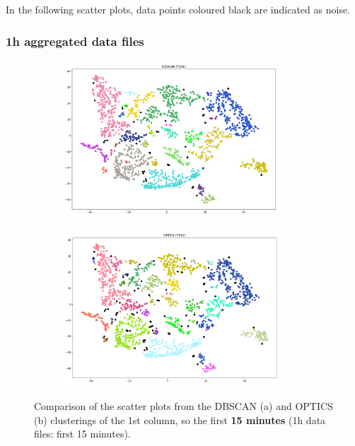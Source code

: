 In the following scatter plots, data points coloured black are indicated as noise.

\subsubsection{1h aggregated data files}

\begin{figure}[H]
	\centering
	\begin{subfigure}{.5\textwidth}
    \centering
    \includegraphics[width=0.9\textwidth]{./images/clusteringResults/1h-1-DBSCAN.png}
  \end{subfigure}%
  \begin{subfigure}{.5\textwidth}
    \centering
    \includegraphics[width=0.9\textwidth]{./images/clusteringResults/1h-1-OPTICS.png}
	\end{subfigure}
	\caption{Comparison of the scatter plots from the DBSCAN (a) and OPTICS (b) clusterings of the 1st column, so the first \textbf{15 minutes} (1h data files: first 15 minutes).}
  \label{figure:finalClustering1h-1}
\end{figure}

